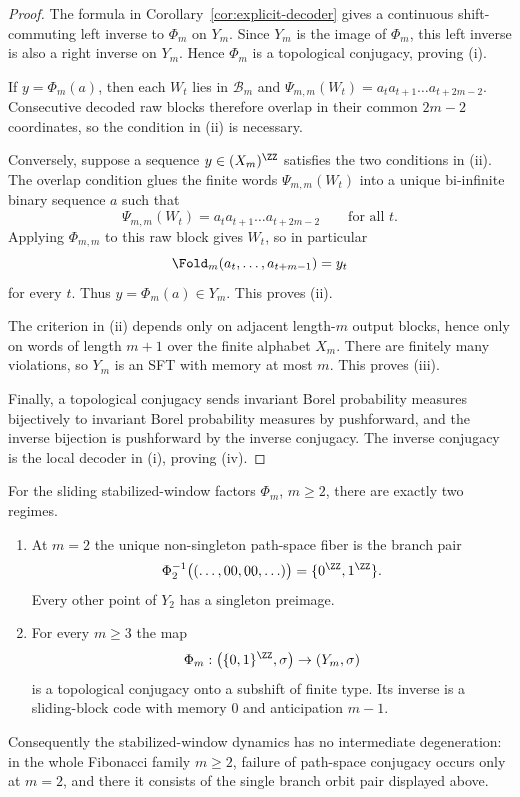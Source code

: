 \begin{proof}
The formula in Corollary~\ref{cor:explicit-decoder} gives a continuous
shift-commuting left inverse to $\Phi_m$ on $Y_m$.  Since $Y_m$ is the image of
$\Phi_m$, this left inverse is also a right inverse on $Y_m$.  Hence $\Phi_m$
is a topological conjugacy, proving (i).

If $y=\Phi_m(a)$, then each $W_t$ lies in $\mathcal B_m$ and
$\Psi_{m,m}(W_t)=a_ta_{t+1}\ldots a_{t+2m-2}$.  Consecutive decoded raw
blocks therefore overlap in their common $2m-2$ coordinates, so the condition
in (ii) is necessary.

Conversely, suppose a sequence $y\in(X_m)^{\ZZ}$ satisfies the two conditions
in (ii).  The overlap condition glues the finite words
$\Psi_{m,m}(W_t)$ into a unique bi-infinite binary sequence $a$ such that
\[
\Psi_{m,m}(W_t)=a_ta_{t+1}\ldots a_{t+2m-2}
\qquad\text{for all }t.
\]
Applying $\Phi_{m,m}$ to this raw block gives $W_t$, so in particular
\[
\Fold_m(a_t,\ldots,a_{t+m-1})=y_t
\]
for every $t$.  Thus $y=\Phi_m(a)\in Y_m$.  This proves (ii).

The criterion in (ii) depends only on adjacent length-$m$ output blocks, hence
only on words of length $m+1$ over the finite alphabet $X_m$.  There are
finitely many violations, so $Y_m$ is an SFT with memory at most $m$.  This
proves (iii).

Finally, a topological conjugacy sends invariant Borel probability measures
bijectively to invariant Borel probability measures by pushforward, and the
inverse bijection is pushforward by the inverse conjugacy.  The inverse
conjugacy is the local decoder in (i), proving (iv).
\end{proof}

\begin{theorem}\label{thm:phase-transition}
For the sliding stabilized-window factors $\Phi_m$, $m\ge2$, there are exactly
two regimes.
\begin{enumerate}[label=(\roman*),leftmargin=*,itemsep=2pt]
  \item At $m=2$ the unique non-singleton path-space fiber is the branch pair
  \[
  \Phi_2^{-1}\bigl((\ldots,00,00,\ldots)\bigr)
  =
  \{0^{\ZZ},1^{\ZZ}\}.
  \]
  Every other point of $Y_2$ has a singleton preimage.
  \item For every $m\ge3$ the map
  \[
  \Phi_m:\bigl(\{0,1\}^{\ZZ},\sigma\bigr)\to(Y_m,\sigma)
  \]
  is a topological conjugacy onto a subshift of finite type. Its inverse is a
  sliding-block code with memory $0$ and anticipation $m-1$.
\end{enumerate}
Consequently the stabilized-window dynamics has no intermediate degeneration:
in the whole Fibonacci family $m\ge2$, failure of path-space conjugacy occurs
only at $m=2$, and there it consists of the single branch orbit pair displayed
above.
\end{theorem}

